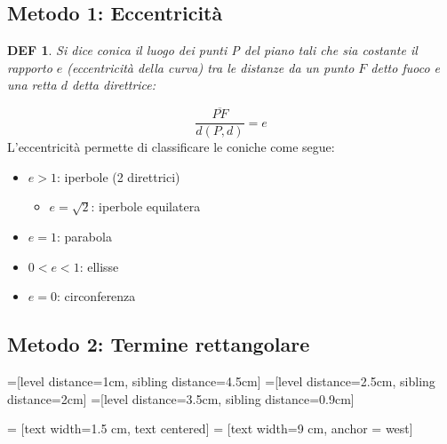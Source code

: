\documentclass{article}
\newtheorem*{definition}{DEF}
\begin{document}
\subsection*{Metodo 1: Eccentricità}
\begin{definition}
Si dice conica il luogo dei punti P del piano tali che sia costante il rapporto $e$ (eccentricità della curva) tra le distanze da un punto $F$ detto fuoco e una retta $d$ detta direttrice:
\end{definition}
\[\frac{\overline{PF}}{d(P, d)}=e\]
L'eccentricità permette di classificare le coniche come segue:
\begin{itemize}
    \item $e>1$: iperbole (2 direttrici)
    \begin{itemize}
        \item $e=\sqrt{2}$: iperbole equilatera
    \end{itemize}
    \item $e=1$: parabola
    \item $0<e<1$: ellisse
    \item $e=0$: circonferenza
\end{itemize}
\subsection*{Metodo 2: Termine rettangolare} 
                =[level distance=1cm, sibling distance=4.5cm]
                =[level distance=2.5cm, sibling distance=2cm]
                =[level distance=3.5cm, sibling distance=0.9cm]
                
                 = [text width=1.5 cm, text centered]
                 = [text width=9 cm, anchor = west]
                
\end{document}
